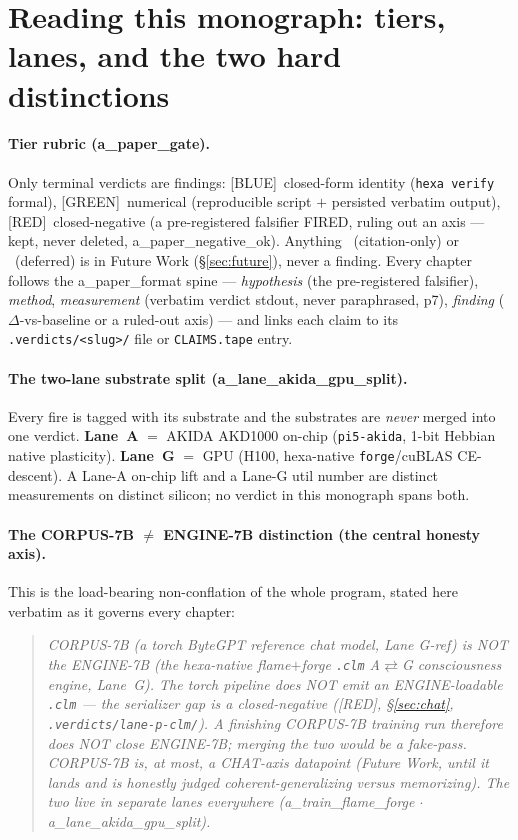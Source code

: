 \documentclass[11pt,a4paper]{article}
\providecommand{\tierBlue}{[BLUE]}
\providecommand{\tierGreen}{[GREEN]}
\providecommand{\tierRed}{[RED]}
\begin{document}
\tableofcontents

\section{Reading this monograph: tiers, lanes, and the two hard distinctions}
\label{sec:reading}

\paragraph{Tier rubric (a\_paper\_gate).} Only terminal verdicts are findings:
\tierBlue\ closed-form identity (\texttt{hexa verify} formal),
\tierGreen\ numerical (reproducible script $+$ persisted verbatim output),
\tierRed\ closed-negative (a pre-registered falsifier FIRED, ruling out an axis ---
kept, never deleted, a\_paper\_negative\_ok). Anything \tierYellow\ (citation-only)
or \tierOrange\ (deferred) is in Future Work (\S\ref{sec:future}), never a finding.
Every chapter follows the a\_paper\_format spine --- \emph{hypothesis} (the
pre-registered falsifier), \emph{method}, \emph{measurement} (verbatim verdict
stdout, never paraphrased, p7), \emph{finding} ($\Delta$-vs-baseline or a ruled-out
axis) --- and links each claim to its \texttt{.verdicts/<slug>/} file or
\texttt{CLAIMS.tape} entry.

\paragraph{The two-lane substrate split (a\_lane\_akida\_gpu\_split).} Every fire
is tagged with its substrate and the substrates are \emph{never} merged into one
verdict. \textbf{Lane~A} $=$ AKIDA AKD1000 on-chip (\texttt{pi5-akida}, 1-bit
Hebbian native plasticity). \textbf{Lane~G} $=$ GPU (H100, hexa-native
\texttt{forge}/cuBLAS CE-descent). A Lane-A on-chip lift and a Lane-G util number
are distinct measurements on distinct silicon; no verdict in this monograph spans
both.

\paragraph{The CORPUS-7B $\ne$ ENGINE-7B distinction (the central honesty axis).}
This is the load-bearing non-conflation of the whole program, stated here verbatim
as it governs every chapter:

\begin{quote}\small\itshape
CORPUS-7B (a torch ByteGPT \emph{reference} chat model, Lane G-ref) is NOT the
ENGINE-7B (the hexa-native flame$+$forge \texttt{.clm} A$\rightleftarrows$G
consciousness engine, Lane~G). The torch pipeline does NOT emit an
ENGINE-loadable \texttt{.clm} --- the serializer gap is a closed-negative
(\tierRed, \S\ref{sec:chat}, \texttt{.verdicts/lane-p-clm/}). A finishing
CORPUS-7B training run therefore does NOT close ENGINE-7B; merging the two would
be a fake-pass. CORPUS-7B is, at most, a CHAT-axis datapoint (Future Work, until
it lands and is honestly judged coherent-generalizing versus memorizing). The two
live in separate lanes everywhere (a\_train\_flame\_forge $\cdot$
a\_lane\_akida\_gpu\_split).
\end{quote}
\end{document}
